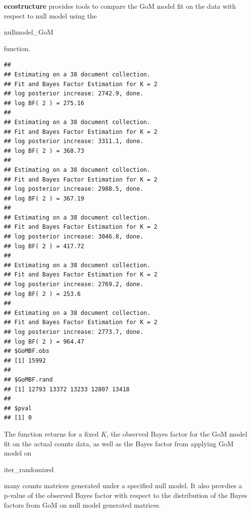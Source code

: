 \documentclass[12pt]{article}
\begin{document}
\newpage

\textbf{ecostructure} provides tools to compare the GoM model fit on the data with respect to null model using the \begin{verb} nullmodel_GoM \end{verb} function.

\begin{knitrout}
\color{fgcolor}\begin{kframe}
\begin{alltt}
 \hlstd{=}\hlstd{,}
               \hlstd{=}\hlstd{,} \hlstd{=}\hlstd{,}
               \hlstd{=}\hlstd{,} \hlstd{=}\hlstd{)}
\end{alltt}
\begin{verbatim}
## 
## Estimating on a 38 document collection.
## Fit and Bayes Factor Estimation for K = 2
## log posterior increase: 2742.9, done.
## log BF( 2 ) = 275.16
## 
## Estimating on a 38 document collection.
## Fit and Bayes Factor Estimation for K = 2
## log posterior increase: 3311.1, done.
## log BF( 2 ) = 368.73
## 
## Estimating on a 38 document collection.
## Fit and Bayes Factor Estimation for K = 2
## log posterior increase: 2988.5, done.
## log BF( 2 ) = 367.19
## 
## Estimating on a 38 document collection.
## Fit and Bayes Factor Estimation for K = 2
## log posterior increase: 3046.8, done.
## log BF( 2 ) = 417.72
## 
## Estimating on a 38 document collection.
## Fit and Bayes Factor Estimation for K = 2
## log posterior increase: 2769.2, done.
## log BF( 2 ) = 253.6
## 
## Estimating on a 38 document collection.
## Fit and Bayes Factor Estimation for K = 2
## log posterior increase: 2773.7, done.
## log BF( 2 ) = 964.47
## $GoMBF.obs
## [1] 15992
## 
## $GoMBF.rand
## [1] 12793 13372 13233 12807 13418
## 
## $pval
## [1] 0
\end{verbatim}
\end{kframe}
\end{knitrout}

The function returns for a fixed $K$, the observed Bayes factor for the GoM model fit on the actual counts data, as well as the Bayes factor from applying GoM model on \begin{verb} iter_randomized \end{verb} many counts matrices generated under a specified null model. It also provdies a p-value of the observed Bayes factor with respect to the distribution of the Bayes factors from GoM on null model generated matrices.
\end{document}
